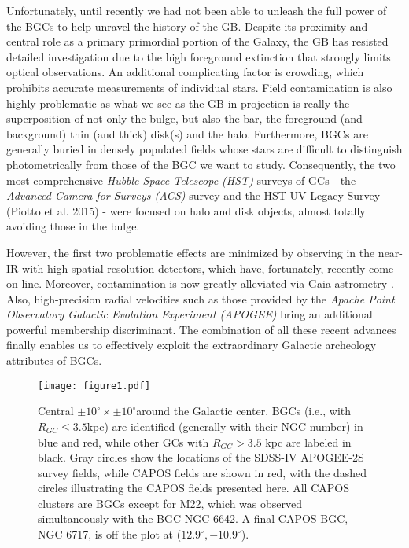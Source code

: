 \documentclass[onecolumn]{aa}
\begin{document}
Unfortunately, until recently we had not been able to unleash the full power of the BGCs to help unravel the history of the GB. Despite its proximity and central role as a primary primordial portion of the Galaxy, the GB has resisted detailed investigation due to the high foreground extinction that strongly limits optical observations. An additional complicating factor is  crowding, which prohibits accurate measurements of individual stars. Field contamination is also highly problematic as what we see as the GB in projection is really the superposition of not only the bulge, but also the bar, the foreground (and background) thin (and thick) disk(s) and the halo. Furthermore, BGCs are generally buried in densely populated fields whose stars are difficult to distinguish photometrically from those of the BGC we want to study. Consequently, the two most comprehensive {\em Hubble Space Telescope (HST)} surveys of GCs - the {\em Advanced Camera for Surveys (ACS)} survey \citep{Sarajedini2007} and the HST UV Legacy Survey (Piotto et al. 2015) -  were focused on halo and disk objects, almost totally avoiding those in the bulge. 

However, the first two problematic effects are minimized by observing in the near-IR with high spatial resolution detectors, which have, fortunately, recently come on line. Moreover, contamination is now greatly alleviated via Gaia astrometry \citep{Gaia-Collaboration2016, Gaia-Collaboration2018}. Also, high-precision radial velocities such as those provided by the {\em Apache Point Observatory Galactic Evolution Experiment (APOGEE)} \citep{Majewski2017} bring an additional powerful membership discriminant. The combination of all these recent 
advances finally enables us to effectively exploit the extraordinary Galactic archeology attributes of BGCs. 

\begin{figure*}
\centering
   \texttt{[image: figure1.pdf]}
      \caption{Central $\pm 10^\circ \times \pm 10^\circ $around the Galactic center. BGCs (i.e.,
with $R_{GC}\leq 3.5$kpc) are identified (generally with their NGC number) in blue and red, while other GCs {with $R_{GC}> 3.5$ kpc} are labeled in black.  Gray circles show the locations of the SDSS-IV APOGEE-2S survey fields, while
CAPOS fields are shown in red, with the dashed circles illustrating the CAPOS fields presented here. All CAPOS clusters are BGCs except for M22, which was observed simultaneously with the BGC NGC 6642. A final CAPOS BGC, NGC 6717, is off the plot at ($12.9^\circ, -10.9^\circ$).}
    \label{fields}
\end{figure*}
\end{document}
